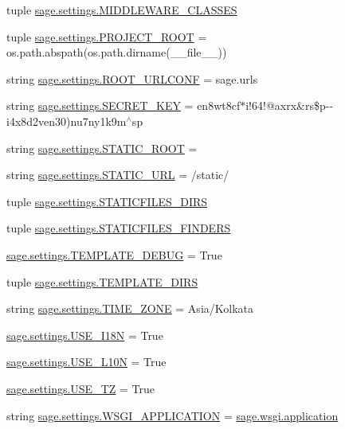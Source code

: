 \begin{DoxyCompactItemize}
\item 
tuple \hyperlink{a00043_a247a0ea3c79f999897dbfaed3bc99b1d}{sage.\+settings.\+M\+I\+D\+D\+L\+E\+W\+A\+R\+E\+\_\+\+C\+L\+A\+S\+S\+E\+S}
\item 
tuple \hyperlink{a00043_ae2e71004e0684c0243b4e9792726cd0f}{sage.\+settings.\+P\+R\+O\+J\+E\+C\+T\+\_\+\+R\+O\+O\+T} = os.\+path.\+abspath(os.\+path.\+dirname(\+\_\+\+\_\+file\+\_\+\+\_\+))
\item 
string \hyperlink{a00043_a92b3d804acae3871a9877ad143df4201}{sage.\+settings.\+R\+O\+O\+T\+\_\+\+U\+R\+L\+C\+O\+N\+F} = \textquotesingle{}sage.\+urls\textquotesingle{}
\item 
string \hyperlink{a00043_acc7cb44e3d92fc1334c19318ede49bc8}{sage.\+settings.\+S\+E\+C\+R\+E\+T\+\_\+\+K\+E\+Y} = \textquotesingle{}en8wt8cf$\ast$i!64!@axrx\&rs\$p-\/-\/i4x8d2ven30)nu7ny1k9m$^\wedge$sp\textquotesingle{}
\item 
string \hyperlink{a00043_a91b967847aecdd4d0edfbb0229656929}{sage.\+settings.\+S\+T\+A\+T\+I\+C\+\_\+\+R\+O\+O\+T} = \textquotesingle{}\textquotesingle{}
\item 
string \hyperlink{a00043_a0b4647cdde23eaed09c255182a9f576c}{sage.\+settings.\+S\+T\+A\+T\+I\+C\+\_\+\+U\+R\+L} = \textquotesingle{}/static/\textquotesingle{}
\item 
tuple \hyperlink{a00043_ac4ae870dea0d58410747ddcbdff2b3d7}{sage.\+settings.\+S\+T\+A\+T\+I\+C\+F\+I\+L\+E\+S\+\_\+\+D\+I\+R\+S}
\item 
tuple \hyperlink{a00043_af629022b1da961fa9828f450bc80bd22}{sage.\+settings.\+S\+T\+A\+T\+I\+C\+F\+I\+L\+E\+S\+\_\+\+F\+I\+N\+D\+E\+R\+S}
\item 
\hyperlink{a00043_a74c98bee40b9b06d51e44be6df73eb46}{sage.\+settings.\+T\+E\+M\+P\+L\+A\+T\+E\+\_\+\+D\+E\+B\+U\+G} = True
\item 
tuple \hyperlink{a00043_addc90c15790d385d304972f1b3098a86}{sage.\+settings.\+T\+E\+M\+P\+L\+A\+T\+E\+\_\+\+D\+I\+R\+S}
\item 
string \hyperlink{a00043_a07421ef620becc4c93753901abdf83c0}{sage.\+settings.\+T\+I\+M\+E\+\_\+\+Z\+O\+N\+E} = \textquotesingle{}Asia/Kolkata\textquotesingle{}
\item 
\hyperlink{a00043_acf5dd02a352695a98f57bef7679a29af}{sage.\+settings.\+U\+S\+E\+\_\+\+I18\+N} = True
\item 
\hyperlink{a00043_a9d0e7298d4688c99e0ee9e965d950de0}{sage.\+settings.\+U\+S\+E\+\_\+\+L10\+N} = True
\item 
\hyperlink{a00043_aa385f778cd7bd79cc4c688fec7c101a2}{sage.\+settings.\+U\+S\+E\+\_\+\+T\+Z} = True
\item 
string \hyperlink{a00043_a700b653427cc28bc1ebe951b419cfd58}{sage.\+settings.\+W\+S\+G\+I\+\_\+\+A\+P\+P\+L\+I\+C\+A\+T\+I\+O\+N} = \textquotesingle{}\hyperlink{a00045_a1ddb23bace7377dbda42c61a804bb9aa}{sage.\+wsgi.\+application}\textquotesingle{}
\end{DoxyCompactItemize}

